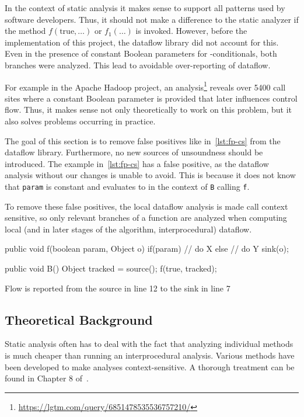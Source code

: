 In the context of static analysis it makes sense to support all patterns
used by software developers.
Thus, it should not make a difference to the static analyzer
if the method $f(\text{true}, \ldots)$ or $f_1(\ldots)$ is invoked.
However, before the implementation of this project, the dataflow library did not 
account for this.
Even in the presence of constant Boolean parameters for -conditionals,
both branches were analyzed.
This lead to avoidable over-reporting of dataflow.

For example in the Apache Hadoop project, an analysis\footnote{\url{https://lgtm.com/query/6851478535536757210/}}
reveals over 5400 call sites 
where a constant Boolean parameter is provided that later influences control flow.
Thus, it makes sense not only theoretically to work on this problem, but it also 
solves problems occurring in practice.

The goal of this section is to remove false positives like in~\autoref{lst:fp-cs}
from the dataflow library.
Furthermore, no new sources of unsoundness should be introduced.
The example in~\autoref{lst:fp-cs} has a false positive,
as the dataflow analysis without our changes is unable to avoid.
This is because it does not know that \texttt{param} is constant and evaluates 
to 
in the context of \texttt{B} calling \texttt{f}.

To remove these false positives, the local dataflow 
analysis is made call context sensitive, so only relevant branches of a function
are analyzed when computing local 
(and in later stages of the algorithm, interprocedural) dataflow.

\begin{listing}
    \begin{javacode}
public void f(boolean param, Object o) {
    if(param) {
        // do X
    }
    else {
        // do Y
        sink(o);
    }
}

public void B() {
    Object tracked = source();
    f(true, tracked);
}
        \end{javacode}
    \caption{Flow is reported from the source in line 12 to the sink in line 7}
    \label{lst:fp-cs}
\end{listing}


\subsection{Theoretical Background}
Static analysis often has to deal with the fact that analyzing individual methods 
is much cheaper than running an interprocedural analysis.
Various methods have been developed to make analyses context-sensitive.
A thorough treatment can be found in Chapter 8 of~\cite{spa}.

